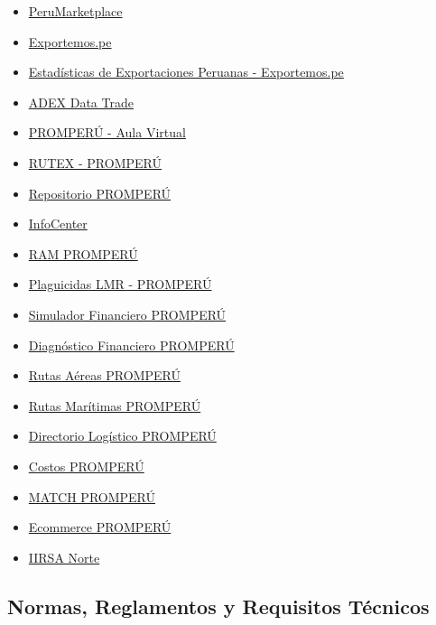 \documentclass[
  jou,
  floatsintext,
  longtable,
  a4paper,
  nolmodern,
  notxfonts,
  notimes,
  colorlinks=true,linkcolor=blue,citecolor=blue,urlcolor=blue]{apa7}
\providecommand{\tightlist}{%
  \setlength{\itemsep}{0pt}\setlength{\parskip}{0pt}}
\begin{document}
\begin{itemize}
\tightlist
\item
  \href{https://www.perumarketplace.com/en}{PeruMarketplace}
\item
  \href{https://exportemos.pe/}{Exportemos.pe}
\item
  \href{https://exportemos.pe/descubre-oportunidades-de-exportacion/estadisticas-de-exportaciones-peruanas}{Estadísticas
  de Exportaciones Peruanas - Exportemos.pe}
\item
  \href{https://adexdatatrade.com/}{ADEX Data Trade}
\item
  \href{https://aulavirtual.promperu.gob.pe/}{PROMPERÚ - Aula Virtual}
\item
  \href{https://rutex.promperu.gob.pe/}{RUTEX - PROMPERÚ}
\item
  \href{https://repositorio.promperu.gob.pe/home}{Repositorio PROMPERÚ}
\item
  \href{https://infocenter.gob.pe/}{InfoCenter}
\item
  \href{https://ram.promperu.gob.pe/}{RAM PROMPERÚ}
\item
  \href{https://plaguicidaslmr.promperu.gob.pe/}{Plaguicidas LMR -
  PROMPERÚ}
\item
  \href{https://simuladorfinanciero.promperu.gob.pe/}{Simulador
  Financiero PROMPERÚ}
\item
  \href{https://diagnosticofinanciero.promperu.gob.pe/}{Diagnóstico
  Financiero PROMPERÚ}
\item
  \href{https://rutasaereas.promperu.gob.pe/}{Rutas Aéreas PROMPERÚ}
\item
  \href{https://rutasmaritimas.promperu.gob.pe/}{Rutas Marítimas
  PROMPERÚ}
\item
  \href{https://directoriologistico.promperu.gob.pe/}{Directorio
  Logístico PROMPERÚ}
\item
  \href{https://costos.promperu.gob.pe/}{Costos PROMPERÚ}
\item
  \href{https://match.promperu.gob.pe/}{MATCH PROMPERÚ}
\item
  \href{https://ecommerce.promperu.gob.pe/}{Ecommerce PROMPERÚ}
\item
  \href{https://www.iirsanorte.com.pe/}{IIRSA Norte}
\end{itemize}

\subsection{Normas, Reglamentos y Requisitos
Técnicos}\label{normas-reglamentos-y-requisitos-tuxe9cnicos}
\end{document}
